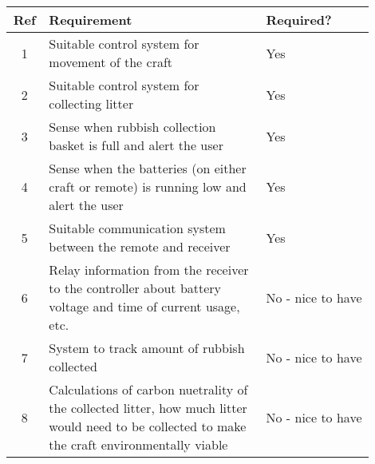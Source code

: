 \documentclass [11pt]{article}
\begin{document}
\begin{table}[H]
\begin{tabular}{||c||p{0.6\linewidth}|p{0.3\linewidth}||}
\hline
Ref & Requirement                                                                                                                                  & Required?         \\ 
\hline
1   & Suitable control system for movement of the craft                                                                                              & Yes               \\
\hline
2   & Suitable control system for collecting litter                                                                                                  & Yes               \\
\hline
3   & Sense when rubbish collection basket is full and alert the user                                                                                & Yes               \\
\hline
4   & Sense when the batteries (on either craft or remote) is running low and alert the user                                                         & Yes               \\
\hline
5   & Suitable communication system between the remote and receiver                                                                                  & Yes               \\
\hline
6   & Relay information from the receiver to the controller about battery voltage and time of current usage, etc.                                    & No - nice to have \\
\hline
7   & System to track amount of rubbish collected                                                                                                    & No - nice to have \\
\hline
8   & Calculations of carbon nuetrality of the collected litter, how much litter would need to be collected to make the craft environmentally viable & No - nice to have \\
\hline
\end{tabular}
\end{table}
\end{document}
